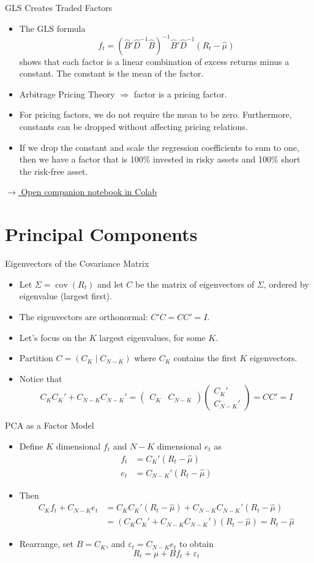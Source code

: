 \documentclass[10pt]{beamer}
\DeclareMathOperator{\cov}{cov}
\newcommand{\bi}{\begin{itemize}}
\newcommand{\ei}{\end{itemize}}
\newcommand{\im}{\item}
\begin{document}
\begin{frame}{GLS Creates Traded Factors}
\begin{itemize}
\item The GLS formula
$$f_t = (\hat{B}'\hat{D}^{-1}\hat{B})^{-1}\hat{B}'\hat{D}^{-1}(R_t - \hat{\mu})$$
shows that each factor is a linear combination of excess returns minus a constant.  The constant is the mean of the factor.

\item Arbitrage Pricing Theory $\Rightarrow$ factor is a pricing factor.

\item For pricing factors, we do not require the mean to be zero.  Furthermore, constants can be dropped without affecting pricing relations.

\item If we drop the constant and scale the regression coefficients to sum to one, then we have a factor that is 100\% invested in risky assets and 100\% short the risk-free asset.
\end{itemize}

\smallskip
{\small \href{https://colab.research.google.com/github/kerryback/busi521/blob/main/FactorAnalysisPrincipalComponents.ipynb}{$\rightarrow$ Open companion notebook in Colab}}
\end{frame}

\section{Principal Components}

\begin{frame}{Eigenvectors of the Covariance Matrix}
\bi
\im Let $\Sigma = \cov(R_t)$ and let $C$ be the matrix of eigenvectors of $\Sigma$, ordered by eigenvalue (largest first).
\im The eigenvectors are orthonormal: $C'C = CC' = I$.
\im Let's focus on the $K$ largest eigenvalues, for some $K$. 
\im Partition $C = (C_K \mid C_{N-K})$ where $C_K$ contains the first $K$ eigenvectors.
\im Notice that
$$C_KC_K' + C_{N-K}C_{N-K}' = \begin{pmatrix} C_K & C_{N-K}\end{pmatrix}\begin{pmatrix}C_K' \\ C_{N-K}'\end{pmatrix} = CC' = I
$$
\ei 
\end{frame}

\begin{frame}{PCA as a Factor Model}
\bi 
\im Define $K$ dimensional $f_t$ and $N-K$ dimensional $e_t$ as
\begin{align*}
f_t &= C_K'(R_t - \hat{\mu}) \\
e_t &= C_{N-K}'(R_t - \hat{\mu})
\end{align*}
\im Then 
\begin{align*}
C_Kf_t + C_{N-K}e_t &= C_KC_K'(R_t - \hat{\mu}) + C_{N-K}C_{N-K}'(R_t - \hat{\mu}) \\
&= (C_KC_K' + C_{N-K}C_{N-K}')(R_t - \hat{\mu}) = R_t - \hat{\mu}
\end{align*}
\im Rearrange, set $B = C_K$, and  $\varepsilon_t = C_{N-K}e_t$ to obtain
$$R_t = \mu + Bf_t + \varepsilon_t $$
\ei
\end{frame}
\end{document}
